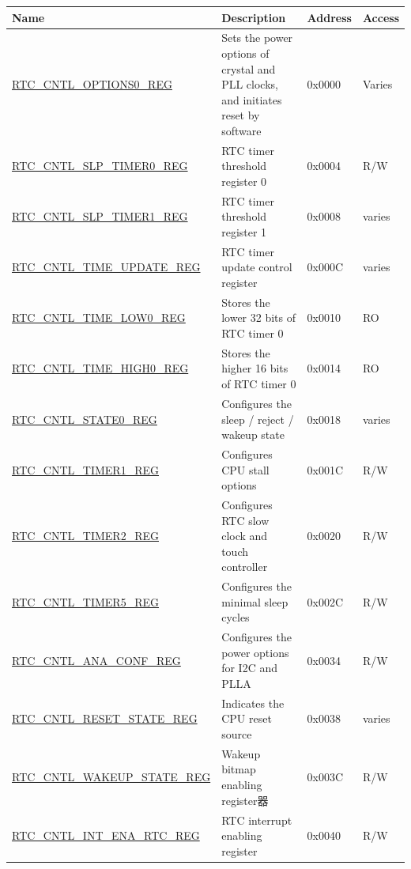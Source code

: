 \begin{longtable}{ | l | p{7cm} | p{1.3cm} | p{1cm} | }
\hline\rowcolor{lightgray}
\textbf{Name} & \textbf{Description} &  \textbf{Address} & \textbf{Access} \\ \hline
\endhead


\hyperref[regdesc:RTCCNTLOPTIONS0REG]{RTC\_CNTL\_OPTIONS0\_REG} & Sets the power options of crystal and PLL clocks, and initiates reset by software  & 0x0000 & Varies \\ \hline
\hyperref[regdesc:RTCCNTLSLPTIMER0REG]{RTC\_CNTL\_SLP\_TIMER0\_REG} & RTC timer threshold register 0 & 0x0004 & R/W \\ \hline
\hyperref[regdesc:RTCCNTLSLPTIMER1REG]{RTC\_CNTL\_SLP\_TIMER1\_REG} & RTC timer threshold register 1 & 0x0008 & varies \\ \hline
\hyperref[regdesc:RTCCNTLTIMEUPDATEREG]{RTC\_CNTL\_TIME\_UPDATE\_REG} & RTC timer update control register & 0x000C & varies \\ \hline
\hyperref[regdesc:RTCCNTLTIMELOW0REG]{RTC\_CNTL\_TIME\_LOW0\_REG} & Stores the lower 32 bits of RTC timer 0 & 0x0010 & RO \\ \hline
\hyperref[regdesc:RTCCNTLTIMEHIGH0REG]{RTC\_CNTL\_TIME\_HIGH0\_REG} & Stores the higher 16 bits of RTC timer 0 & 0x0014 & RO \\ \hline
\hyperref[regdesc:RTCCNTLSTATE0REG]{RTC\_CNTL\_STATE0\_REG} & Configures the sleep / reject / wakeup state & 0x0018 & varies \\ \hline
\hyperref[regdesc:RTCCNTLTIMER1REG]{RTC\_CNTL\_TIMER1\_REG} & Configures CPU stall options & 0x001C & R/W \\ \hline
\hyperref[regdesc:RTCCNTLTIMER2REG]{RTC\_CNTL\_TIMER2\_REG} & Configures RTC slow clock and touch controller & 0x0020 & R/W \\ \hline
\hyperref[regdesc:RTCCNTLTIMER5REG]{RTC\_CNTL\_TIMER5\_REG} & Configures the minimal sleep cycles & 0x002C & R/W \\ \hline
\hyperref[regdesc:RTCCNTLANACONFREG]{RTC\_CNTL\_ANA\_CONF\_REG} & Configures the power options for I2C and PLLA & 0x0034 & R/W \\ \hline
\hyperref[regdesc:RTCCNTLRESETSTATEREG]{RTC\_CNTL\_RESET\_STATE\_REG} & Indicates the CPU reset source & 0x0038 & varies \\ \hline
\hyperref[regdesc:RTCCNTLWAKEUPSTATEREG]{RTC\_CNTL\_WAKEUP\_STATE\_REG} & Wakeup bitmap enabling register器 & 0x003C & R/W \\ \hline
\hyperref[regdesc:RTCCNTLINTENARTCREG]{RTC\_CNTL\_INT\_ENA\_RTC\_REG} & RTC interrupt enabling register & 0x0040 & R/W \\ \hline

\end{longtable}
